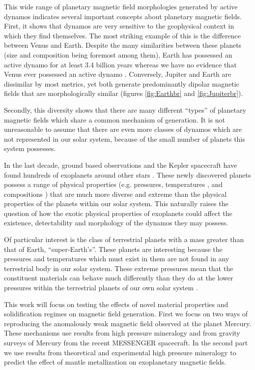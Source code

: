 This wide range of planetary magnetic field morphologies generated by active dynamos indicates several important concepts about planetary magnetic fields. First, it shows that dynamos are very sensitive to the geophysical context in which they find themselves. The most striking example of this is the difference between Venus and Earth. Despite the many similarities between these planets (size and composition being foremost among them), Earth has possessed an active dynamo for at least 3.4 billion years \citep{tarduno2010} whereas we have no evidence that Venus ever possessed an active dynamo \citep{russell1980}. Conversely, Jupiter and Earth are dissimilar by most metrics, yet both generate predominantly dipolar magnetic fields that are morphologically similar (figures \ref{fig:Earthbr} and \ref{fig:Jupiterbr}). 

Secondly, this diversity shows that there are many different ``types'' of planetary magnetic fields which share a common mechanism of generation. It is not unreasonable to assume that there are even more classes of dynamos which are not represented in our solar system, because of the small number of planets this system possesses.

In the last decade, ground based observations and the Kepler spacecraft have found hundreds of exoplanets around other stars \citep{rein2015}. These newly discovered planets possess a range of physical properties (e.g. pressures, temperatures \citep{seager2007, valencia2006}, and  compositions \citep{elkins2008, elkins2008coreless}) that are much more diverse and extreme than the physical properties of the planets within our solar system. This naturally raises the question of how the exotic physical properties of exoplanets could affect the existence, detectability and morphology of the dynamos they may possess. 

Of particular interest is the class of terrestrial planets with a mass greater than that of Earth, ``super-Earth's''. These planets are interesting because the pressures and temperatures which must exist in them are not found in any terrestrial body in our solar system. These extreme pressures mean that the constituent materials can behave much differently than they do at the lower pressures within the terrestrial planets of our own solar system \citep{karato2011}. 

This work will focus on testing the effects of novel material properties and solidification regimes on magnetic field generation. First we focus on two ways of reproducing the anomalously weak magnetic field observed at the planet Mercury. These mechanisms use results from high pressure mineralogy and from gravity surveys of Mercury from the recent MESSENGER spacecraft. In the second part we use results from theoretical and experimental high pressure mineralogy to predict the effect of mantle metallization on exoplanetary magnetic fields. 
